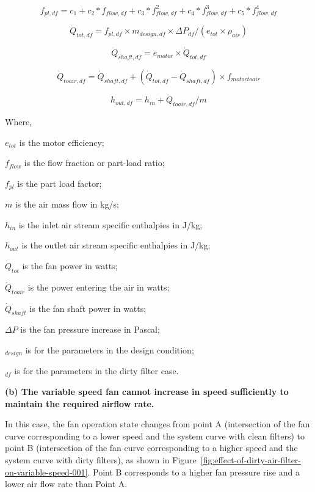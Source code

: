 \begin{equation}
f_{pl,df} = c_{1} + c_{2}*f_{flow,df} + c_{3}*f_{flow,df}^2 + c_{4}*f_{flow,df}^3 + c_{5}*f_{flow,df}^4
\end{equation}

\begin{equation}
\dot{Q}_{tot,df} = f_{pl,df} \times m_{design,df} \times \Delta P_{df} / (e_{tot} \times \rho_{air} )
\end{equation}

\begin{equation}
\dot{Q}_{shaft,df} = e_{motor} \times \dot{Q}_{tot, df}
\end{equation}

\begin{equation}
\dot{Q}_{toair,df} = \dot{Q}_{shaft,df} +( \dot{Q}_{tot,df} - \dot{Q}_{shaft,df}) \times f_{motortoair}
\end{equation}

\begin{equation}
h_{out,df} = h_{in} + \dot{Q}_{toair,df} / m
\end{equation}

Where,

\(e_{tot}\) is the motor efficiency;

\(f_{flow}\) is the flow fraction or part-load ratio;

\(f_{pl}\) is the part load factor;

\(m\) is the air mass flow in kg/s;

\(h_{in}\) is the inlet air stream specific enthalpies in J/kg;

\(h_{out}\) is the outlet air stream specific enthalpies in J/kg;

\(\dot{Q}_{tot}\) is the fan power in watts;

\(\dot{Q}_{toair}\) is the power entering the air in watts;

\(\dot{Q}_{shaft}\) is the fan shaft power in watts;

\(\Delta P\) is the fan pressure increase in Pascal;

\(_{design}\) is for the parameters in the design condition;

\(_{df}\) is for the parameters in the dirty filter case.

\textbf{(b) The variable speed fan cannot increase in speed sufficiently to maintain the required airflow rate.}

In this case, the fan operation state changes from point A (intersection of the fan curve corresponding to a lower speed and the system curve with clean filters) to point B (intersection of the fan curve corresponding to a higher speed and the system curve with dirty filters), as shown in Figure~\ref{fig:effect-of-dirty-air-filter-on-variable-speed-001}. Point B corresponds to a higher fan pressure rise and a lower air flow rate than Point A.

